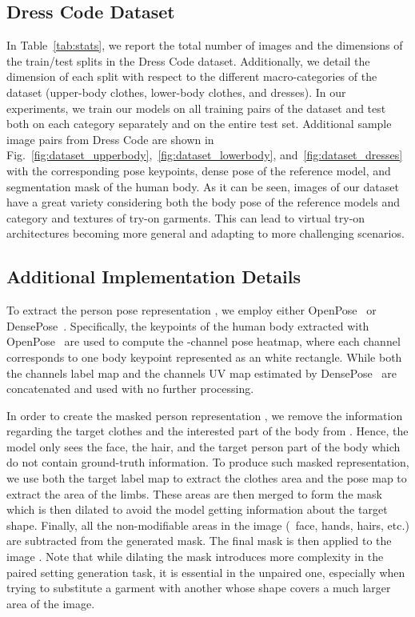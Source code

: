 \subsection*{Dress Code Dataset}
In Table~\ref{tab:stats}, we report the total number of images and the dimensions of the train/test splits in the Dress Code dataset. Additionally, we detail the dimension of each split with respect to the different macro-categories of the dataset (upper-body clothes, lower-body clothes, and dresses). In our experiments, we train our models on all training pairs of the dataset and test both on each category separately and on the entire test set. Additional sample image pairs from Dress Code are shown in Fig.~\ref{fig:dataset_upperbody},~\ref{fig:dataset_lowerbody}, and~\ref{fig:dataset_dresses} with the corresponding pose keypoints, dense pose of the reference model, and segmentation mask of the human body. As it can be seen, images of our dataset have a great variety considering both the body pose of the reference models and category and textures of try-on garments. This can lead to virtual try-on architectures becoming more general and adapting to more challenging scenarios.

\subsection*{Additional Implementation Details}

To extract the person pose representation , we employ either OpenPose~\cite{cao2017realtime} or DensePose~\cite{guler2018densepose}. Specifically, the keypoints of the human body extracted with OpenPose~\cite{cao2017realtime} are used to compute the -channel pose heatmap, where each channel corresponds to one body keypoint represented as an  white rectangle. While both the  channels label map and the  channels UV map estimated by DensePose~\cite{guler2018densepose} are concatenated and used with no further processing.

In order to create the masked person representation , we remove the information regarding the target clothes and the interested part of the body from . Hence, the model only sees the face, the hair, and the target person part of the body which do not contain ground-truth information. 
To produce such masked representation, we use both the target label map to extract the clothes area and the pose map to extract the area of the limbs. These areas are then merged to form the mask which is then dilated to avoid the model getting information about the target shape. Finally, all the non-modifiable areas in the image (\eg~face, hands, hairs, etc.) are subtracted from the generated mask. The final mask is then applied to the image . Note that while dilating the mask introduces more complexity in the paired setting generation task, it is essential in the unpaired one, especially when trying to substitute a garment with another whose shape covers a much larger area of the image.  

